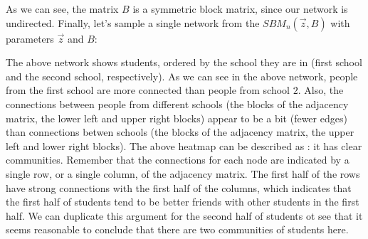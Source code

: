 \documentclass[letterpaper,10pt,english]{jupyterBook}
\begin{document}
\noindent{}

\sphinxAtStartPar
As we can see, the matrix \(B\) is a symmetric block matrix, since our network is undirected. Finally, let’s sample a single network from the \(SBM_n(\vec z, B)\) with parameters \(\vec z\) and \(B\):

\begin{sphinxVerbatim}[commandchars=\\\{\}]
   
   
   

  \PYG{p}{[} \PYG{p}{]}   
  \PYG{p}{[}     \PYG{p}{]}  \PYG{p}{[}     \PYG{p}{]}
  
\end{sphinxVerbatim}

\noindent{}

\sphinxAtStartPar
The above network shows students, ordered by the school they are in (first school and the second school, respectively). As we can see in the above network, people from the first school are more connected than people from school \(2\). Also, the connections between people from different schools (the  blocks of the adjacency matrix, the lower left and upper right blocks) appear to be a bit  (fewer edges) than connections betwen schools (the  blocks of the adjacency matrix, the upper left and lower right blocks). The above heatmap can be described as : it has clear communities. Remember that the connections for each node are indicated by a single row, or a single column, of the adjacency matrix. The first half of the rows have strong connections with the first half of the columns, which indicates that the first half of students tend to be better friends with other students in the first half. We can duplicate this argument for the second half of students ot see that it seems reasonable to conclude that there are two communities of students here.
\end{document}
